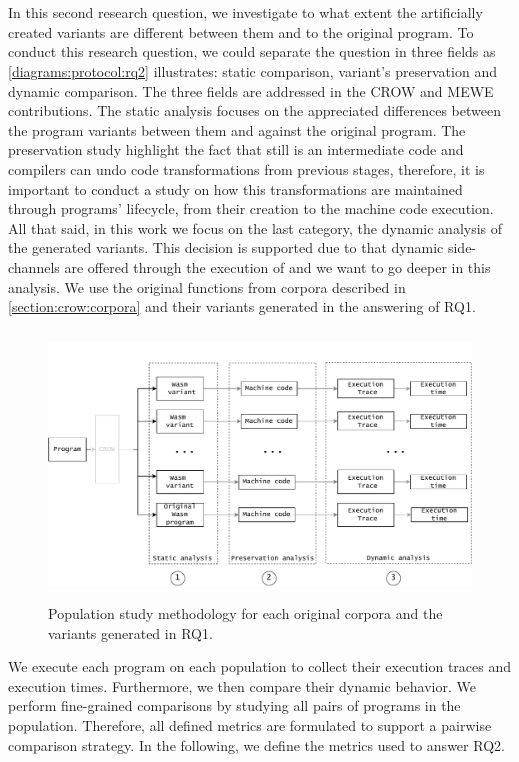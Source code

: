 
\section{\rqtwo}

In this second research question, we investigate to what extent the artificially created variants are different between them and to the original program. To conduct this research question, we could separate the question in three fields as \autoref{diagrams:protocol:rq2} illustrates: static comparison, variant's preservation and  dynamic comparison. The three fields are addressed in the CROW and MEWE contributions.
The static analysis focuses on the appreciated differences between the program variants between them and against the original program. The preservation study highlight the fact that \wasm still is an intermediate code and compilers can undo code transformations from previous stages, therefore, it is important to conduct a study on how this transformations are maintained through \wasm programs' lifecycle, from their creation to the machine code execution.
All that said, in this work we focus on the last category, the dynamic analysis of the generated variants. This decision is supported due to that dynamic side-channels are offered through the execution of \wasm and we want to go deeper in this analysis.
We use the original functions from corpora described in \autoref{section:crow:corpora} and their variants generated in the answering of RQ1. 

\begin{figure}[h]
    \centering
    \includegraphics[height=2.8in]{diagrams/Rq2.pdf}
    \caption{Population study methodology for each original corpora and the variants generated in RQ1.}
    \label{diagrams:protocol:rq2}
\end{figure}

We execute each program on each population to collect their execution traces and execution times. Furthermore, we then compare their dynamic behavior. We perform fine-grained comparisons by studying all pairs of programs in the population. Therefore, all defined metrics are formulated to support a pairwise comparison strategy.
In the following, we define the metrics used to answer RQ2.

